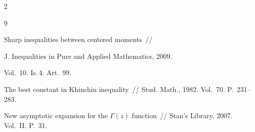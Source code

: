 \begin{multicols}{2}
{{\begin{thebibliography}{9}




Sharp inequalities between centered moments~// 


J. Inequalities in Pure and Applied Mathematics, 2009.


Vol.~10. Is.\,4. Art.~99.









The best constant in Khinchin inequality~// Stud. Math., 1982. Vol.~70. P.~231--283.





\label{end\stat}









New asymptotic expansion for the  $\Gamma(z)$ function~// Stan's Library, 2007. Vol.~II. P.~31.


 \end{thebibliography}


}


}








\end{multicols}


